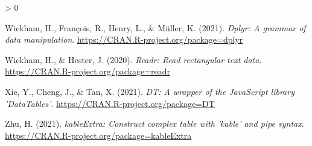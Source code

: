 \documentclass[
  english,
  man]{apa7}
\newlength{\cslhangindent}
\newenvironment{CSLReferences}[2] %
 {%
  \setlength{\parindent}{0pt}
  \ifodd #1 \everypar{\setlength{\hangindent}{\cslhangindent}}\ignorespaces\fi
  \ifnum #2 > 0
  \setlength{\parskip}{#2\baselineskip}
  \fi
 }%
 {}
\begin{document}
\begin{CSLReferences}{1}{0}
\leavevmode\hypertarget{ref-R-dplyr}{}%
Wickham, H., François, R., Henry, L., \& Müller, K. (2021). \emph{Dplyr: A grammar of data manipulation}. \url{https://CRAN.R-project.org/package=dplyr}

\leavevmode\hypertarget{ref-R-readr}{}%
Wickham, H., \& Hester, J. (2020). \emph{Readr: Read rectangular text data}. \url{https://CRAN.R-project.org/package=readr}

\leavevmode\hypertarget{ref-R-DT}{}%
Xie, Y., Cheng, J., \& Tan, X. (2021). \emph{DT: A wrapper of the JavaScript library 'DataTables'}. \url{https://CRAN.R-project.org/package=DT}

\leavevmode\hypertarget{ref-R-kableExtra}{}%
Zhu, H. (2021). \emph{kableExtra: Construct complex table with 'kable' and pipe syntax}. \url{https://CRAN.R-project.org/package=kableExtra}

\end{CSLReferences}

\endgroup
\end{document}
